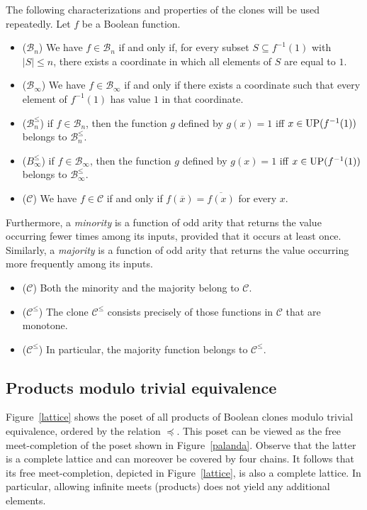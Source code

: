 \documentclass{amsart}
\numberwithin{equation}{section}
\theoremstyle{plain}
\theoremstyle{definition}
\def\clone#1{\mathcal{#1}}
\def\Bc{\clone{B}}
\def\Cc{\clone{C}}
\def\UP{{\rm UP}}
\begin{document}
The following characterizations and properties of the clones will be used repeatedly. Let $f$ be a Boolean function.
\begin{itemize}
\item ($\Bc_n$) 
We have $f\in\Bc_n$ if and only if, for every subset $S\subseteq f^{-1}(1)$ with $|S|\leq n$, there exists a coordinate in which all elements of $S$ are equal to $1$.

\item ($\Bc_\infty$) We have $f\in\Bc_\infty$ if and only if there exists a coordinate such that every element of $f^{-1}(1)$ has value $1$ in that coordinate.
\item ($\Bc_n^{\leq}$) if $f\in\Bc_n$, then the function $g$ defined by $g(x) = 1$ iff $x\in \UP(f^{-1}(1))$ belongs to $\Bc_n^{\leq}$.

\item ($B_\infty^{\leq}$) if $f\in\Bc_\infty$, then the function $g$ defined by $g(x) = 1$ iff $x\in \UP(f^{-1}(1))$ belongs to $\Bc_\infty^{\leq}$.

\item ($\Cc$) We have $f\in \Cc$ if and only if $f(\overline{x}) = \overline{f(x)}$ for every $x$.
\end{itemize}
    Furthermore, a {\em minority} is a function of odd arity that returns the value occurring fewer times among its inputs, provided that it occurs at least once. Similarly, a {\em majority} is a function of odd arity that returns the value occurring more frequently among its inputs.
\begin{itemize}
\item ($\Cc$) Both the minority and the majority belong to $\Cc$.
\item ($\Cc^{\leq}$) The clone $\Cc^{\leq}$ consists precisely of those functions in $\Cc$ that are monotone.
\item ($\Cc^{\leq}$) In particular, the majority function belongs to $\Cc^{\leq}$.
\end{itemize}

\subsection{Products modulo trivial equivalence}

Figure~\ref{lattice} shows the poset of all products of Boolean clones modulo trivial equivalence, ordered by the relation $\preceq$. This poset can be viewed as the free meet-completion of the poset shown in Figure~\ref{palanda}. Observe that the latter is a complete lattice and can moreover be covered by four chains. It follows that its free meet-completion, depicted in Figure~\ref{lattice}, is also a complete lattice. In particular, allowing infinite meets (products) does not yield any additional elements. 
\end{document}
